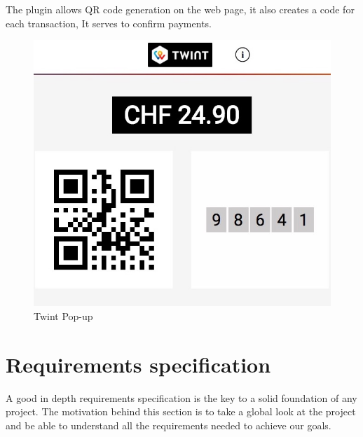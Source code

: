 \begin{spacing}{1.2}
\begin{itemize}
The plugin allows QR code generation on the web page, it also creates a code for each transaction, It serves to confirm payments.
\begin{figure}[!ht]\centering
\includegraphics[scale=0.3]{twint.jpg}
\caption{Twint Pop-up}
\label{fig:fig1}
\end{figure}
  \end{itemize}
  
  

\section{Requirements specification}
A good in depth requirements specification is the key to a solid foundation of any project.
The motivation behind this section is to take a global look at the project and be able to understand all the requirements needed to achieve our goals.

\end{spacing}
